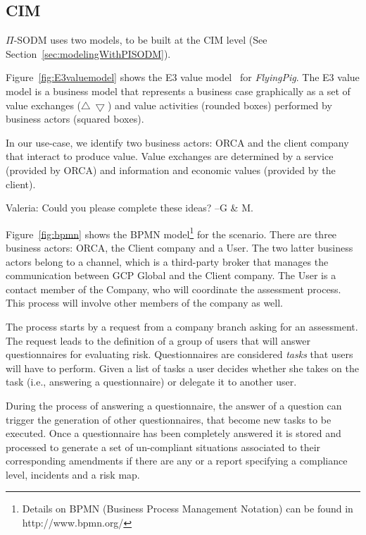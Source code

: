 \subsection{CIM}

$\Pi$-SODM uses two models, to be built at the CIM level (See Section~\ref{sec:modelingWithPISODM}).

Figure~\ref{fig:E3valuemodel} shows the E3 value model~\cite{e3value} for \textsl{FlyingPig}.
The E3 value model is a business model that represents a business case graphically as a set of value exchanges ($\bigtriangleup\ \bigtriangledown$) and value activities (rounded boxes) performed by business actors (squared boxes). 

In our use-case, we identify two business actors: ORCA and the client company that interact to produce value.
Value exchanges are determined by a service (provided by ORCA) and information and economic values (provided by the client).

{\color{magenta} Valeria: Could you please complete these ideas? --G \& M.}


Figure~\ref{fig:bpmn} shows the BPMN model\footnote{Details on BPMN (Business Process Management Notation) can be found in http://www.bpmn.org/} for the scenario. 
There are three business actors: ORCA, the Client company and a User.
The two latter business actors belong to a channel, which is a third-party broker that manages the communication between GCP Global and the Client company. 
The User is a contact member of the Company, who will coordinate the assessment process.
This process will involve other members of the company as well.

The process  starts by a request from a company branch asking for an assessment. 
The request leads to the definition of a group of users that will answer questionnaires for evaluating risk. 
Questionnaires are considered \textit{tasks} that users will have to perform. 
Given a list of tasks a user decides whether she takes on the task (i.e., answering a questionnaire) or delegate it to another user. 
 
During the process of answering a questionnaire, the answer of a question can trigger the generation of other questionnaires, that become new tasks to be executed. Once a questionnaire has been completely answered it is stored and processed to generate a set of un-compliant situations associated to their corresponding amendments if there are any or a report specifying a compliance level, incidents and a risk map. 

